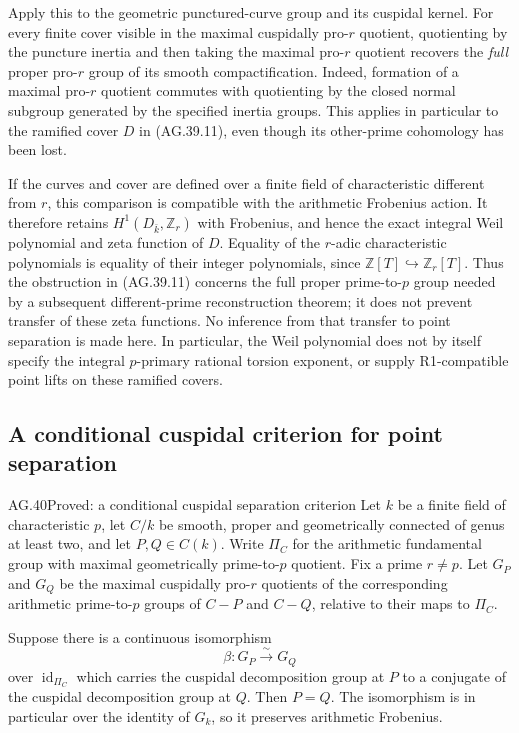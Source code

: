 Apply this to the geometric punctured-curve group and
its cuspidal kernel. For every finite cover visible in
the maximal cuspidally pro-\(r\) quotient, quotienting
by the puncture inertia and then taking the maximal
pro-\(r\) quotient recovers the \emph{full} proper
pro-\(r\) group of its smooth compactification.
Indeed, formation of a maximal pro-\(r\) quotient
commutes with quotienting by the closed normal subgroup
generated by the specified inertia groups. This applies
in particular to the ramified cover \(D\) in
(AG.39.11), even though its other-prime cohomology has
been lost.

If the curves and cover are defined over a finite field
of characteristic different from \(r\), this comparison
is compatible with the arithmetic Frobenius action.
It therefore retains \(H^1(D_{\bar k},\mathbb Z_r)\)
with Frobenius, and hence the exact integral Weil
polynomial and zeta function of \(D\). Equality of the
\(r\)-adic characteristic polynomials is equality of
their integer polynomials, since
\(\mathbb Z[T]\hookrightarrow\mathbb Z_r[T]\).
Thus the obstruction in (AG.39.11) concerns the full
proper prime-to-\(p\) group needed by a subsequent
different-prime reconstruction theorem; it does not
prevent transfer of these zeta functions. No inference
from that transfer to point separation is made here.
In particular, the Weil polynomial does not by itself
specify the integral \(p\)-primary rational torsion
exponent, or supply R1-compatible point lifts on these
ramified covers.


\subsection{A conditional cuspidal criterion for point separation}

\begin{claim}{AG.40}{Proved: a conditional cuspidal separation criterion}
\label{clm:AGcuspidalcriterion}
Let \(k\) be a finite field of characteristic \(p\), let
\(C/k\) be smooth, proper and geometrically connected of
genus at least two, and let \(P,Q\in C(k)\).
Write \(\Pi_C\) for the arithmetic fundamental group with
maximal geometrically prime-to-\(p\) quotient. Fix a prime
\(r\ne p\). Let \(G_P\) and \(G_Q\) be the maximal
cuspidally pro-\(r\) quotients of the corresponding
arithmetic prime-to-\(p\) groups of \(C-P\) and \(C-Q\),
relative to their maps to \(\Pi_C\).

Suppose there is a continuous isomorphism
\[
                  \beta:G_P\xrightarrow{\sim}G_Q
\]
over \(\operatorname{id}_{\Pi_C}\) which carries the
cuspidal decomposition group at \(P\) to a conjugate of
the cuspidal decomposition group at \(Q\). Then \(P=Q\).
The isomorphism is in particular over the identity of
\(G_k\), so it preserves arithmetic Frobenius.
\end{claim}

